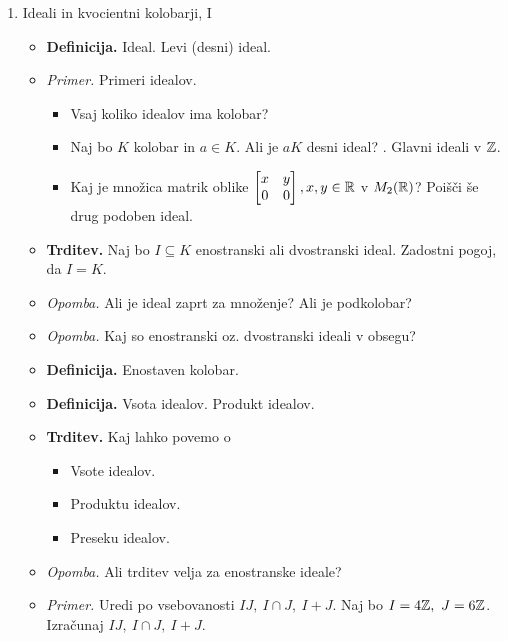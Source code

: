 \begin{enumerate}
    \item Ideali in kvocientni kolobarji, I
    \begin{itemize}
        \item \colorbox{purple!30}{\textbf{Definicija.}} Ideal. Levi (desni) ideal.
        \item \colorbox{yellow!30}{\emph{Primer.}} Primeri idealov.
        \begin{itemize}
            \item Vsaj koliko idealov ima kolobar?
            \item Naj bo $K$ kolobar in $a \in K$. Ali je $aK$ desni ideal? . Glavni ideali v $\mathbb{Z}$.
            \item Kaj je množica matrik oblike $\begin{bmatrix}
                x & y \\ 0 & 0
            \end{bmatrix}, x,y \in \mathbb{R}$ v $M_2(\mathbb{R})$? Poišči še drug podoben ideal.         
        \end{itemize}
        \item \colorbox{blue!30}{\textbf{Trditev.}} Naj bo $I \subseteq K$ enostranski ali dvostranski ideal. Zadostni pogoj, da $I = K$.
            \item \colorbox{yellow!30}{\emph{Opomba.}} Ali je ideal zaprt za množenje? Ali je podkolobar?
            \item \colorbox{yellow!30}{\emph{Opomba.}} Kaj so enostranski oz. dvostranski ideali v obsegu?
            \item \colorbox{purple!30}{\textbf{Definicija.}} Enostaven kolobar.
            \item \colorbox{purple!30}{\textbf{Definicija.}} Vsota idealov. Produkt idealov.
            \item \colorbox{blue!30}{\textbf{Trditev.}} Kaj lahko povemo o
        \begin{itemize}
            \item Vsote idealov.
            \item Produktu idealov.
            \item Preseku idealov.
        \end{itemize}
        \item \colorbox{yellow!30}{\emph{Opomba.}} Ali trditev velja za enostranske ideale?
        \item \colorbox{yellow!30}{\emph{Primer.}} Uredi po vsebovanosti  $IJ, \ I \cap J, \ I + J$. Naj bo $I = 4\mathbb{Z}, \ J = 6\mathbb{Z}$. Izračunaj $IJ, \ I \cap J, \ I + J$.

\end{itemize}
\end{enumerate}
